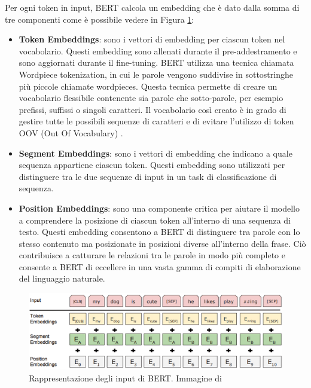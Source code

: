 \documentclass[../../Thesis.tex]{subfiles}
\begin{document}
Per ogni token in input, BERT calcola un embedding che \`e dato dalla somma di tre componenti come \`e possibile vedere in Figura \ref{fig:bert_embedding}:
\begin{itemize}
    \item \textbf{Token Embeddings}: sono i vettori di embedding per ciascun token nel vocabolario. Questi embedding sono allenati durante il pre-addestramento e sono aggiornati durante il fine-tuning. BERT utilizza una tecnica chiamata Wordpiece tokenization, in cui le parole vengono
    suddivise in sottostringhe pi\`u piccole chiamate wordpieces. Questa tecnica permette di
    creare un vocabolario flessibile contenente sia parole che sotto-parole, per esempio
    prefissi, suffissi o singoli caratteri. Il vocabolario cos\`i creato \`e in grado di gestire tutte le
    possibili sequenze di caratteri e di evitare l'utilizzo di token OOV (Out Of Vocabulary) \cite{WordPiece}.
    \item \textbf{Segment Embeddings}: sono i vettori di embedding che indicano a quale sequenza appartiene ciascun token. Questi embedding sono utilizzati per distinguere tra le due sequenze di input in un task di classificazione di sequenza.
    \item \textbf{Position Embeddings}: sono una componente critica per aiutare il modello a comprendere la posizione di ciascun token all'interno di una sequenza di testo. Questi embedding consentono a BERT di distinguere tra parole con lo stesso contenuto ma posizionate in posizioni diverse all'interno della frase. Ci\`o contribuisce a catturare le relazioni tra le parole in modo pi\`u completo e consente a BERT di eccellere in una vasta gamma di compiti di elaborazione del linguaggio naturale.
\end{itemize}

\begin{figure}[H]
    \centering
    \includegraphics[width=\textwidth]{../../img/bert-input.png}
    \caption{Rappresentazione degli input di BERT. Immagine di \cite{BERT}}
    \label{fig:bert_embedding}
\end{figure}
\end{document}
